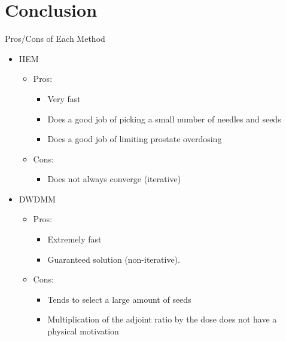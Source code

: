 \documentclass{beamer}
\begin{document}
\section{Conclusion}
\begin{frame}{Pros/Cons of Each Method}

  \begin{itemize}
    \item IIEM
      \begin{itemize}
        \item Pros:
          \begin{itemize}
            \item Very fast
            \item Does a good job of picking a small number of needles and
              seeds
            \item Does a good job of limiting prostate overdosing
          \end{itemize}
        \item Cons:
          \begin{itemize}
            \item Does not always converge (iterative)
          \end{itemize}
      \end{itemize}
      \medskip
    \item DWDMM
      \begin{itemize}
        \item Pros:
          \begin{itemize}
            \item Extremely fast 
            \item Guaranteed solution (non-iterative).
          \end{itemize}
        \item Cons:
          \begin{itemize}
            \item Tends to select a large amount of seeds
            \item Multiplication of the adjoint ratio by the dose does not have
              a physical motivation
          \end{itemize}
      \end{itemize}
  \end{itemize}

\end{frame}
\end{document}
